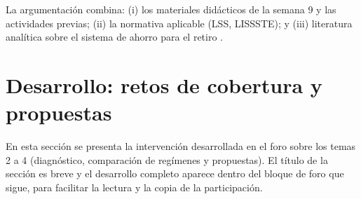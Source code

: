 \documentclass[11pt,letterpaper,oneside]{article}
\begin{document}
La argumentación combina: (i) los materiales didácticos de la semana 9 y las actividades previas; (ii) la normativa aplicable (LSS, LISSSTE); y (iii) literatura analítica sobre el sistema de ahorro para el retiro \citep{lss2026,lissste2026,consarSitio2026,bricenoRuiz2011}.

\section{Desarrollo: retos de cobertura y propuestas}

En esta sección se presenta la intervención desarrollada en el foro sobre los temas 2 a 4 (diagnóstico, comparación de regímenes y propuestas). El título de la sección es breve y el desarrollo completo aparece dentro del bloque de foro que sigue, para facilitar la lectura y la copia de la participación.
\end{document}
